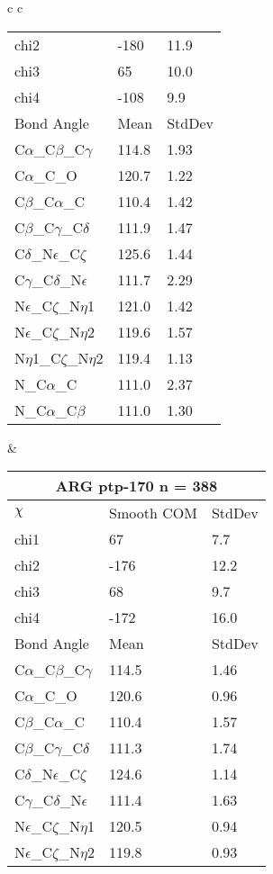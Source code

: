 \begin{longtable}{ c c }
\begin{tabular}{ l l l }
  chi2 & -180 & 11.9 \\ 
  chi3 & 65 & 10.0 \\ 
  chi4 & -108 & 9.9 \\ \midrule
  Bond Angle   & Mean     & StdDev \\ \midrule
  C$\alpha$\_C$\beta$\_C$\gamma$ & 114.8 & 1.93\\
  C$\alpha$\_C\_O & 120.7 & 1.22\\
  C$\beta$\_C$\alpha$\_C & 110.4 & 1.42\\
  C$\beta$\_C$\gamma$\_C$\delta$ & 111.9 & 1.47\\
  C$\delta$\_N$\epsilon$\_C$\zeta$ & 125.6 & 1.44\\
  C$\gamma$\_C$\delta$\_N$\epsilon$ & 111.7 & 2.29\\
  N$\epsilon$\_C$\zeta$\_N$\eta$1 & 121.0 & 1.42\\
  N$\epsilon$\_C$\zeta$\_N$\eta$2 & 119.6 & 1.57\\
  N$\eta$1\_C$\zeta$\_N$\eta$2 & 119.4 & 1.13\\
  N\_C$\alpha$\_C & 111.0 & 2.37\\
  N\_C$\alpha$\_C$\beta$ & 111.0 & 1.30\\
  \bottomrule
  \end{tabular}
  &
  \begin{tabular}{ l l l }
  \toprule
  \multicolumn{3}{c}{ARG \textbf{ptp-170} n = 388} \\ \toprule
  $\chi$       & Smooth COM & StdDev \\ \midrule
  chi1 & 67 & 7.7 \\ 
  chi2 & -176 & 12.2 \\ 
  chi3 & 68 & 9.7 \\ 
  chi4 & -172 & 16.0 \\ \midrule
  Bond Angle   & Mean     & StdDev \\ \midrule
  C$\alpha$\_C$\beta$\_C$\gamma$ & 114.5 & 1.46\\
  C$\alpha$\_C\_O & 120.6 & 0.96\\
  C$\beta$\_C$\alpha$\_C & 110.4 & 1.57\\
  C$\beta$\_C$\gamma$\_C$\delta$ & 111.3 & 1.74\\
  C$\delta$\_N$\epsilon$\_C$\zeta$ & 124.6 & 1.14\\
  C$\gamma$\_C$\delta$\_N$\epsilon$ & 111.4 & 1.63\\
  N$\epsilon$\_C$\zeta$\_N$\eta$1 & 120.5 & 0.94\\
  N$\epsilon$\_C$\zeta$\_N$\eta$2 & 119.8 & 0.93\\

\end{tabular}
\end{longtable}
